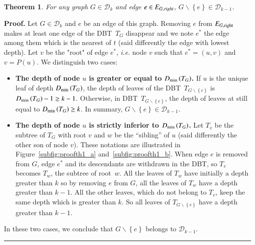\documentclass[preprint]{elsarticle}
\newtheorem{theorem}{Theorem}
\newenvironment{proof}[1][Proof]{\textbf{#1.} }{\ \rule{0.5em}{0.5em}}
\newcommand{\set}[1]{\left\{ #1 \right\}}
\newcommand{\card}[1]{\left| #1 \right|}
\newcommand{\mcalg}{\mathcal{G}}
\newcommand{\mcald}{\mathcal{D}}
\newcommand{\ebt}{DBT}
\newcommand{\compbin}[1]{\mathcal{C}_{\mbox{\scriptsize{B}}}\left( #1 \right)}
\newcommand{\dmin}{D_{\mbox{\scriptsize{min}}}}
\newcommand{\eright}[1]{E_{#1, \mbox{\scriptsize{right}}}}
\begin{document}
\begin{theorem}
For any graph $G \in \mcald_k$ and edge $e \in E_{G, \emph{right}}$, $G \backslash \set{e} \in \mcald_{k-1}$.
\label{th:completebinary}
\end{theorem}
\begin{proof}
Let $G \in \mcald_k$ and $e$ be an edge of this graph. Removing $e$ from $\eright{G}$ makes at least one edge of the \ebt ~$T_G$ disappear and we note $e^*$ the edge among them which is the nearest of $t$ (said differently the edge with lowest depth). Let $v$ be the "root" of edge $e^*$, {\em i.e.} node $v$ such that $e^* = (u, v)$ and $v = P(u)$. We distinguish two cases:
\begin{itemize}[leftmargin=0.5cm]
\item {\bf The depth of node $u$ is greater or equal to $\dmin\left(T_G\right)$.} If $u$ is the unique leaf of depth $\dmin\left(T_G\right)$, the depth of leaves of the \ebt ~$T_{G\backslash \set{e}}$ is $\dmin\left(T_G\right) - 1 \geq k-1$. Otherwise, in \ebt ~$T_{G\backslash \set{e}}$, the depth of leaves at still equal to $\dmin\left(T_G\right) \geq k$. In summary, $G\backslash \set{e} \in \mcald_{k-1}$.
\item {\bf The depth of node $u$ is strictly inferior to $\dmin\left(T_G\right)$.} Let $T_v$ be the subtree of $T_G$ with root $v$ and $w$ be the ``sibling'' of $u$ (said differently the other son of node $v$). These notations are illustrated in Figure~\ref{subfig:proofth1_a} and~\ref{subfig:proofth1_b}. When edge $e$ is removed from $G$, edge $e^*$ and its descendants are withdrawn in the \ebt , so $T_v$ becomes $T_w$, the subtree of root~$w$. All the leaves of $T_w$ have initially a depth greater than $k$ so by removing $e$ from $G$, all the leaves of $T_w$ have a depth greater than $k-1$. All the other leaves, which do not belong to $T_v$, keep the same depth which is greater than $k$. So all leaves of $T_{G \backslash \set{e}}$ have a depth greater than $k-1$.
\end{itemize}
In these two cases, we conclude that $G\backslash \set{e}$ belongs to  
$\mcald_{k-1}$.
\end{proof}
\end{document}
